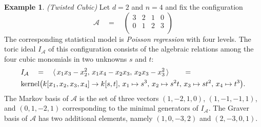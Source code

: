 \documentclass[11pt]{amsart}
\theoremstyle{definition}
\newtheorem{example}[theorem]{Example}
\newcommand{\A}{{\mathcal A}}
\begin{document}
\begin{example}
\label{exm:twistedcubic} {\sl (Twisted Cubic) }
Let $d = 2 $ and $n = 4$ and fix the configuration
\begin{equation}
\label{twiscubmatrix}
  \A  \quad = \quad
\begin{pmatrix}
3 & 2 & 1 & 0 \\
0 & 1 & 2 & 3 \\
\end{pmatrix}
\end{equation}
The corresponding statistical model is
{\em Poisson regression} with four levels.
The toric ideal $I_\A$ of this configuration
consists of the
algebraic relations among the four cubic
monomials in two unknowns $s$ and $t$:
\begin{eqnarray*}
& I_\A \quad = \quad
  \langle \,
x_1 x_3 - x_2^2, \,
x_1 x_4 - x_2 x_3, \,
x_2 x_3 - x_3^2 \, \rangle \qquad = \\
&  {\rm kernel}
\bigl( k[x_1,x_2,x_3,x_4] \rightarrow k[s,t], \,
x_1 \mapsto s^3, \,
x_2 \mapsto s^2 t, \,
x_3 \mapsto s t^2, \,
x_4 \mapsto t^3 \bigr) .
\end{eqnarray*}
The Markov basis of $\A$ is the set of three
vectors $(1,-2,1,0)$, $(1,-1,-1,1)$, and $(0,1,-2,1)$
corresponding to the minimal generators of $I_\A$.
The Graver basis of $\A$ has two additional elements,
namely $(1,0,-3,2)$ and $(2,-3,0,1)$.


\end{example}
\end{document}
